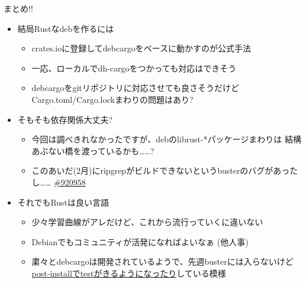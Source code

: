 \documentclass[cjk,dvipdfmx,10pt,compress,fragile%
hyperref={bookmarks=true,bookmarksnumbered=true,bookmarksopen=false,%
colorlinks=false,%
pdftitle={第 134 回 関西 Debian 勉強会},%
pdfauthor={小林},%
pdfsubject={資料},%
}]{beamer}
\begin{document}
\begin{frame}[t,fragile]{まとめ!!}
\begin{itemize}
 \item 結局Rustなdebを作るには
       \begin{itemize}
	\item crates.ioに登録してdebcargoをベースに動かすのが公式手法
	\item 一応、ローカルでdh-cargoをつかっても対応はできそう
	\item debcargoをgitリポジトリに対応させても良さそうだけど
	      Cargo.toml/Cargo.lockまわりの問題はあり?
       \end{itemize}
 \item そもそも依存関係大丈夫?
       \begin{itemize}
	\item 今回は調べきれなかったですが、debのlibrust-*パッケージまわりは
	      結構あぶない橋を渡っているかも……?
	\item このあいだ(2月)にripgrepがビルドできないというbusterのバグがあったし……
	      \href{https://bugs.debian.org/cgi-bin/bugreport.cgi?bug=920958}{\#920958}
       \end{itemize}
 \item それでもRustは良い言語
       \begin{itemize}
	\item 少々学習曲線がアレだけど、これから流行っていくに違いない
	\item Debianでもコミュニティが活発になればよいなぁ (他人事)
	\item 粛々とdebcargoは開発されているようで、先週busterには入らないけど
	      \href{https://alioth-lists.debian.net/pipermail/pkg-rust-maintainers/2019-March/005296.html}
	      {post-installでtestがきるようになったり}している模様
       \end{itemize}
\end{itemize}
\end{frame}

\end{document}
